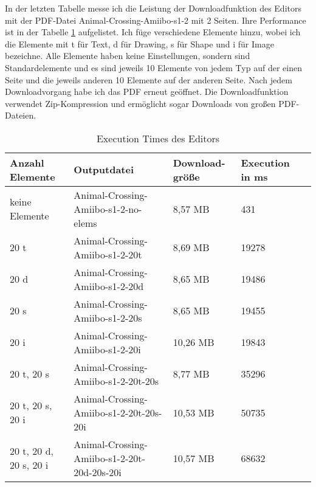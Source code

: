 In der letzten Tabelle messe ich die Leistung der Downloadfunktion des Editors mit der PDF-Datei Animal-Crossing-Amiibo-s1-2 mit 2 Seiten. Ihre Performance ist in der Tabelle \ref{table:editor-dur} aufgelistet. Ich füge verschiedene Elemente hinzu, wobei ich die Elemente mit t für Text, d für Drawing, s für Shape und i für Image bezeichne. Alle Elemente haben keine Einstellungen, sondern sind Standardelemente und es sind jeweils 10 Elemente von jedem Typ auf der einen Seite und die jeweils anderen 10 Elemente auf der anderen Seite. Nach jedem Downloadvorgang habe ich das PDF erneut geöffnet. Die Downloadfunktion verwendet Zip-Kompression und ermöglicht sogar Downloads von großen PDF-Dateien.

\begin{table}[!htbp]
	\centering
	\begin{tabular}{|p{2cm}|p{4cm}|p{2cm}|p{2cm}|p{2cm}|}
		\hline
		\textbf{Anzahl Elemente}			& \textbf{Outputdatei}							& \textbf{Download-größe}	& \textbf{Execution in ms} 	\\ 
		\hline
		keine Elemente 						& Animal-Crossing-Amiibo-s1-2-no-elems			& 8,57 MB					& 431      					\\
		20 t 								& Animal-Crossing-Amiibo-s1-2-20t				& 8,69 MB					& 19278       				\\
		20 d 								& Animal-Crossing-Amiibo-s1-2-20d				& 8,65 MB					& 19486    					\\
		20 s 								& Animal-Crossing-Amiibo-s1-2-20s				& 8,65 MB					& 19455       				\\
		20 i 								& Animal-Crossing-Amiibo-s1-2-20i				& 10,26 MB					& 19843      				\\
		20 t, 20 s 							& Animal-Crossing-Amiibo-s1-2-20t-20s			& 8,77 MB					& 35296      				\\
		20 t, 20 s, 20 i 					& Animal-Crossing-Amiibo-s1-2-20t-20s-20i		& 10,53 MB					& 50735      				\\
		20 t, 20 d, 20 s, 20 i 				& Animal-Crossing-Amiibo-s1-2-20t-20d-20s-20i	& 10,57 MB					& 68632    					\\
		\hline
	\end{tabular}
	\caption{Execution Times des Editors}
	\label{table:editor-dur}
\end{table}